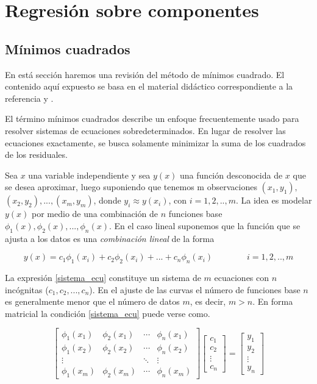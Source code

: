 \chapter{Regresión sobre componentes}

\section{Mínimos cuadrados}

En está sección haremos una revisión del método de mínimos cuadrado. El contenido aquí expuesto se basa en el material didáctico correspondiente a la referencia \cite{minimos} y \cite{Metodos}.

El término mínimos cuadrados describe un enfoque frecuentemente usado para resolver sistemas de ecuaciones sobredeterminados. En lugar de resolver las ecuaciones exactamente, se busca solamente minimizar la suma de los cuadrados de los residuales. 

Sea $x$ una variable independiente y sea $y(x)$ una función desconocida de $x$ que se desea aproximar, luego suponiendo que tenemos m observaciones $(x_{1}, y_{1}),$ $(x_{2},y_{2}), ...,(x_{m}, y_{m})$, donde $y_{i} \approx y(x_{i})$, con $i = 1, 2, .., m$. La idea es modelar $y(x)$ por medio de una combinación de $n$ funciones base $\phi_{1}(x), \phi_{2}(x), ..., \phi_{n}(x)$. En el caso lineal suponemos que la función que se ajusta a los datos es una \textit{combinación lineal} de la forma

\begin{equation} \label{sistema_ecu}
	y(x) = c_{1}\phi_{1}(x_{i}) + c_{2}\phi_{2}(x_{i}) + ... + c_{n}\phi_{n}(x_{i}) \qquad\qquad i=1, 2, .., m
\end{equation}

La expresión \ref{sistema_ecu} constituye un sistema de $m$ ecuaciones con $n$ incógnitas ($c_{1}, c_{2}, ..., c_{n}$). En el ajuste de las curvas el número de funciones base $n$ es generalmente menor que el número de datos $m$, es decir, $m > n$. En forma matricial la condición \ref{sistema_ecu} puede verse como. 

\begin{equation}\label{rep_matriz}
\begin{bmatrix}
\phi_{1}(x_{1}) & \phi_{2}(x_{1}) & \cdots & \phi_{n}(x_{1}) \\
\phi_{1}(x_{2}) & \phi_{2}(x_{2}) & \cdots & \phi_{n}(x_{2}) \\
\vdots & & \ddots & \vdots \\
\phi_{1}(x_{m}) & \phi_{2}(x_{m}) & \cdots & \phi_{n}(x_{m}) 
\end{bmatrix}
\begin{bmatrix}
c_{1}\\
c_{2}\\
\vdots\\
c_{n}
\end{bmatrix}
=
\begin{bmatrix}
y_{1}\\
y_{2}\\
\vdots\\
y_{n}
\end{bmatrix}
\end{equation} 

